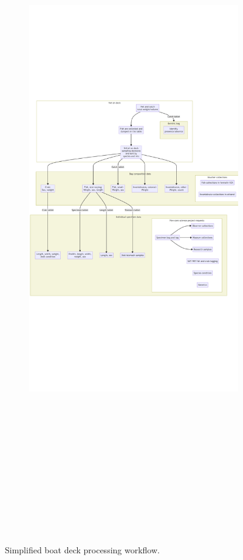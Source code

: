 \documentclass[
  letterpaper,
  oneside,
  open=any]{scrbook}
\begin{document}
\begin{figure}
{\begin{figure}[H]
{\centering \includegraphics[width=16.02in,height=14.6in]{content/intro-workflow_files/figure-latex/mermaid-figure-1.png}

}

\end{figure}

}

\caption{\label{fig-deck-bio-workflow}Simplified boat deck processing
workflow.}

\end{figure}
\end{document}
